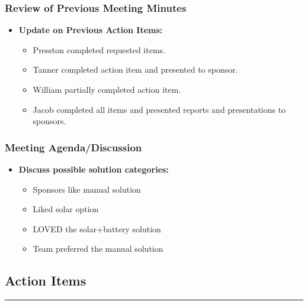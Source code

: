 \documentclass[12pt]{article}
\begin{document}
\subsubsection*{Review of Previous Meeting Minutes}
\begin{itemize}[noitemsep, topsep=0pt]
    \item \textbf{Update on Previous Action Items:}
    \begin{itemize}[noitemsep, topsep=0pt]
        \item Presston completed requested items. 
        \item Tanner completed action item and presented to sponsor.
        \item William partially completed action item. 
        \item Jacob completed all items and presented reports and presentations to sponsors.
    \end{itemize}
\end{itemize}

\subsubsection*{Meeting Agenda/Discussion}
\begin{itemize}[noitemsep, topsep=0pt]
    \item \textbf{Discuss possible solution categories:}
    \begin{itemize}[noitemsep, topsep=0pt]
        \item Sponsors like manual solution
        \item Liked solar option
        \item LOVED the solar+battery solution
        \item Team preferred the manual solution%
    \end{itemize}
\end{itemize}


\subsection*{Action Items}
\vspace{-1.3em}
\rule{\textwidth}{1pt}
\vspace{-1em}
\end{document}

